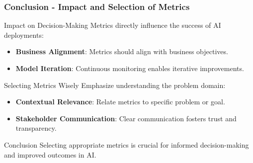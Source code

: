 \documentclass[aspectratio=169]{beamer}
\begin{document}
\begin{frame}[fragile]
    \frametitle{Conclusion - Impact and Selection of Metrics}
    \begin{block}{Impact on Decision-Making}
        Metrics directly influence the success of AI deployments:
    \end{block}
    \begin{itemize}
        \item \textbf{Business Alignment}: Metrics should align with business objectives.
        \item \textbf{Model Iteration}: Continuous monitoring enables iterative improvements.
    \end{itemize}
    
    \begin{block}{Selecting Metrics Wisely}
        Emphasize understanding the problem domain:
    \end{block}
    \begin{itemize}
        \item \textbf{Contextual Relevance}: Relate metrics to specific problem or goal.
        \item \textbf{Stakeholder Communication}: Clear communication fosters trust and transparency.
    \end{itemize}
    
    \begin{block}{Conclusion}
        Selecting appropriate metrics is crucial for informed decision-making and improved outcomes in AI.
    \end{block}
\end{frame}
\end{document}
